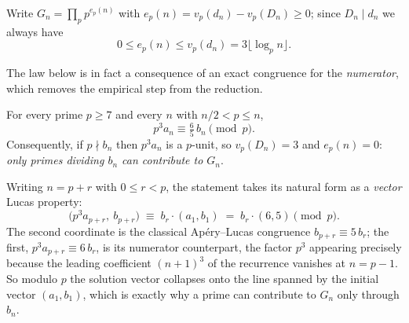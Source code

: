 Write $G_n=\prod_p p^{e_p(n)}$ with $e_p(n)=v_p(d_n)-v_p(D_n)\ge0$; since $D_n\mid d_n$ we
always have
\[
  0\le e_p(n)\le v_p(d_n)=3\lfloor\log_p n\rfloor .
\tag{$\ast$}
\]

The law below is in fact a consequence of an exact congruence for the \emph{numerator}, which
removes the empirical step from the reduction.

\begin{proposition}\label{prop:numcong}
For every prime $p\ge7$ and every $n$ with $n/2<p\le n$,
\[
  \boxed{\;p^3a_n\equiv\tfrac65\,b_n\pmod p.\;}
\]
Consequently, if $p\nmid b_n$ then $p^3a_n$ is a $p$-unit, so $v_p(D_n)=3$ and $e_p(n)=0$:
\emph{only primes dividing $b_n$ can contribute to $G_n$}.
\end{proposition}

Writing $n=p+r$ with $0\le r<p$, the statement takes its natural form as a \emph{vector}
Lucas property:
\[
  \boxed{\;\bigl(p^3a_{p+r},\ b_{p+r}\bigr)\;\equiv\;b_r\cdot(a_1,b_1)\;=\;b_r\cdot(6,5)
  \pmod p.\;}
\]
The second coordinate is the classical Ap\'ery--Lucas congruence $b_{p+r}\equiv5\,b_r$; the
first, $p^3a_{p+r}\equiv6\,b_r$, is its numerator counterpart, the factor $p^3$ appearing
precisely because the leading coefficient $(n+1)^3$ of the recurrence vanishes at $n=p-1$.  So
modulo $p$ the solution vector collapses onto the line spanned by the initial vector
$(a_1,b_1)$, which is exactly why a prime can contribute to $G_n$ only through $b_n$.

